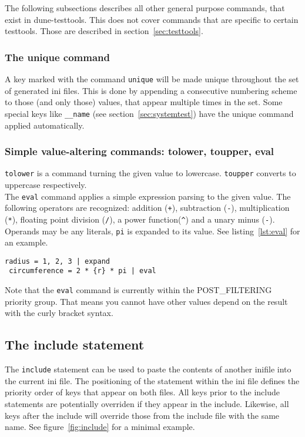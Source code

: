 \documentclass[11pt]{article}
\begin{document}
The following subsections describes all other general purpose commands, that exist in dune-testtools. This does not cover commands that are specific to certain testtools. Those are described in section~\ref{sec:testtools}.

\subsubsection{The unique command}

A key marked with the command \lstinline!unique! will be made unique throughout the set of generated ini files. This is done by appending a consecutive numbering scheme to those (and only those) values, that appear multiple times in the set. Some special keys like \lstinline!__name! (see section~\ref{sec:systemtest}) have the unique command applied automatically.

\subsubsection{Simple value-altering commands: tolower, toupper, eval}

\lstinline!tolower! is a command turning the given value to lowercase. \lstinline!toupper! converts to uppercase respectively. \\

The \lstinline!eval! command applies a simple expression parsing to the given value. The following operators are recognized: addition (\lstinline!+!), subtraction (\lstinline!-!), multiplication (\lstinline!*!), floating point division (\lstinline!/!), a power function(\lstinline!^!) and a unary minus (\lstinline!-!). Operands may be any literals, \lstinline!pi! is expanded to its value. See listing~\ref{lst:eval} for an example.

\begin{lstlisting}[caption={An example of the eval command},label=lst:eval]
 radius = 1, 2, 3 | expand
 circumference = 2 * {r} * pi | eval
\end{lstlisting}

Note that the \lstinline!eval! command is currently within the POST_FILTERING priority group. That means you cannot have other values depend on the result with the curly bracket syntax.

\subsection{The include statement}
The \lstinline!include! statement can be used to paste the contents of another inifile into the current ini file. The positioning of the statement within the ini file defines the priority order of keys that appear on both files. All keys prior to the include statements are potentially overriden if they appear in the include. Likewise, all keys after the include will override those from the include file with the same name. See figure~\ref{fig:include} for a minimal example. \\
\end{document}
